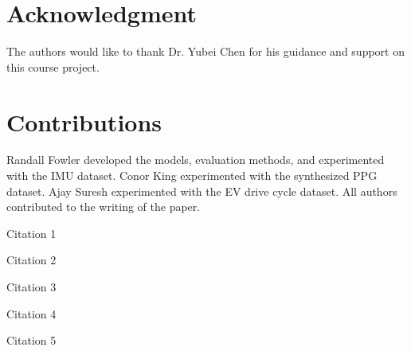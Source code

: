 \documentclass[conference]{IEEEtran}
\begin{document}
\section*{Acknowledgment}
The authors would like to thank Dr. Yubei Chen for his guidance and support on this course project.

\section*{Contributions}
Randall Fowler developed the models, evaluation methods, and experimented with the IMU dataset. 
Conor King experimented with the synthesized PPG dataset. 
Ajay Suresh experimented with the EV drive cycle dataset. 
All authors contributed to the writing of the paper.

\begin{thebibliography}{1}


Citation 1

Citation 2

Citation 3

Citation 4

Citation 5

\end{thebibliography}
\end{document}
